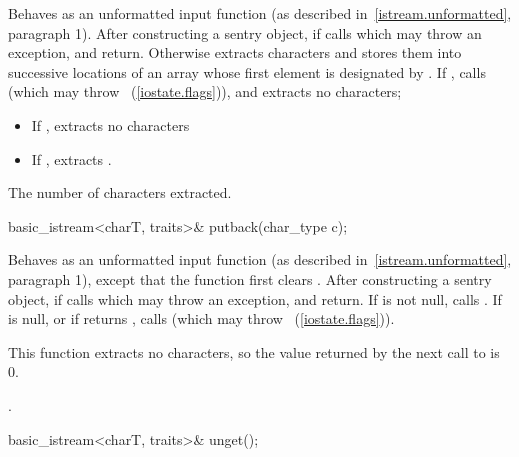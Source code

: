 \begin{itemdescr}
\pnum
\effects
Behaves as an unformatted input function (as described in~\ref{istream.unformatted}, paragraph 1).
After constructing
a sentry object, if
calls
which may throw an exception,
and return.
Otherwise extracts characters and stores them
into successive locations of an array whose first element is designated by
.
If
,
calls
(which may throw
~(\ref{iostate.flags})),
and extracts no characters;
\begin{itemize}
\item
If
,
extracts no characters
\item
If
,
extracts
.
\end{itemize}

\pnum
\returns
The number of characters extracted.
\end{itemdescr}

%
\begin{itemdecl}
basic_istream<charT, traits>& putback(char_type c);
\end{itemdecl}

\begin{itemdescr}
\pnum
\effects
Behaves as an unformatted input function (as described in~\ref{istream.unformatted}, paragraph
1), except that the function first clears .
After constructing
a sentry object, if
calls
which may throw an exception,
and return.
If
is not null, calls
.
If
is null, or if
returns
,
calls
(which may throw
~(\ref{iostate.flags})).
\begin{note}
This
function extracts no characters, so the value returned by the next call to
is 0.
\end{note}

\pnum
\returns
{}.
\end{itemdescr}

%
\begin{itemdecl}
basic_istream<charT, traits>& unget();
\end{itemdecl}

